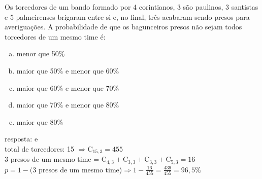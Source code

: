 \begin{ex}
 Os torcedores de um bando formado por  4 corintianos, 3 são paulinos, 3 santistas e 5 palmeirenses brigaram entre si e, no final, três acabaram sendo presos para averiguações. A probabilidade de que os bagunceiros presos não sejam todos torcedores de um mesmo time é: 
    \begin{enumerate}[(a)]
    \item menor que 50\%
    \item maior que 50\% e menor que 60\%
    \item maior que 60\% e menor que 70\%
    \item maior que 70\% e menor que 80\%
    \item maior que 80\%
    \end{enumerate}
      \begin{sol}
        resposta: e \\
        total de torcedores: 15
        $\Longrightarrow\mathrm{C}_{{15},3}=455$  \\
        3 presos de um mesmo time =
        $\mathrm{C}_{4,3}+\mathrm{C}_{3,3}+\mathrm{C}_{3,3}+\mathrm{C}_{5,3}=16$ \\
        $p=1-(3$ presos de um mesmo time)$ \Longrightarrow1-\frac{16}{455}=\frac{439}{455}=96,5\%$
        
        
      \end{sol}
\end{ex}